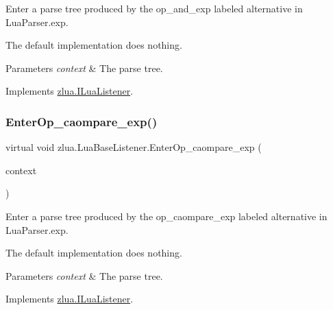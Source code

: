 Enter a parse tree produced by the {\ttfamily op\+\_\+and\+\_\+exp} labeled alternative in Lua\+Parser.\+exp. 

The default implementation does nothing.


\begin{DoxyParams}{Parameters}
{\em context} & The parse tree.\\
\hline
\end{DoxyParams}


Implements \mbox{\hyperlink{interfacezlua_1_1_i_lua_listener_a12bd95b1347e95dcdcdc7d2fdc22558b}{zlua.\+I\+Lua\+Listener}}.

\mbox{\label{classzlua_1_1_lua_base_listener_a9882ebd74c5ae33d72487bddb4f960ec}} 
\subsubsection{\texorpdfstring{Enter\+Op\+\_\+caompare\+\_\+exp()}{EnterOp\_caompare\_exp()}}
{\footnotesize\ttfamily virtual void zlua.\+Lua\+Base\+Listener.\+Enter\+Op\+\_\+caompare\+\_\+exp (\begin{DoxyParamCaption}\item[{\mbox{[}\+Not\+Null\mbox{]} \mbox{\hyperlink{classzlua_1_1_lua_parser_1_1_op__caompare__exp_context}{Lua\+Parser.\+Op\+\_\+caompare\+\_\+exp\+Context}}}]{context }\end{DoxyParamCaption})\hspace{0.3cm}{\ttfamily [virtual]}}



Enter a parse tree produced by the {\ttfamily op\+\_\+caompare\+\_\+exp} labeled alternative in Lua\+Parser.\+exp. 

The default implementation does nothing.


\begin{DoxyParams}{Parameters}
{\em context} & The parse tree.\\
\hline
\end{DoxyParams}


Implements \mbox{\hyperlink{interfacezlua_1_1_i_lua_listener_a15745713dc5965a0337698761f16947d}{zlua.\+I\+Lua\+Listener}}.

\mbox{\label{classzlua_1_1_lua_base_listener_afa38e97552715d422e07b0de65ea18b1}} 
